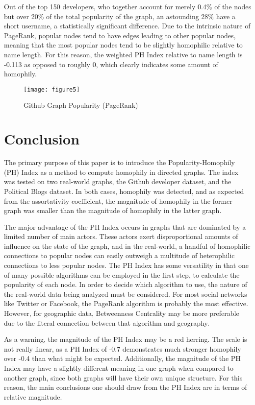 \documentclass{article}
\begin{document}
Out of the top 150 developers, who together account for merely 0.4\% of
the nodes but over 20\% of the total popularity of the graph, an
astounding 28\% have a short username, a statistically significant
difference. Due to the intrinsic nature of PageRank, popular nodes tend
to have edges leading to other popular nodes, meaning that the most
popular nodes tend to be slightly homophilic relative to name length.
For this reason, the weighted PH Index relative to name length is -0.113
as opposed to roughly 0, which clearly indicates some amount of
homophily.

\begin{figure}
  \centering
	\texttt{[image: figure5]}
	\caption{Github Graph Popularity (PageRank)}
	\label{page_rank}
\end{figure}

\section{Conclusion}

The primary purpose of this paper is to introduce the
Popularity-Homophily (PH) Index as a method to compute homophily in
directed graphs. The index was tested on two real-world graphs, the
Github developer dataset, and the Political Blogs dataset. In both
cases, homophily was detected, and as expected from the assortativity
coefficient, the magnitude of homophily in the former graph was smaller
than the magnitude of homophily in the latter graph.

The major advantage of the PH Index occurs in graphs that are dominated
by a limited number of main actors. These actors exert disproportional
amounts of influence on the state of the graph, and in the real-world, a
handful of homophilic connections to popular nodes can easily outweigh a
multitude of heterophilic connections to less popular nodes. The PH
Index has some versatility in that one of many possible algorithms can
be employed in the first step, to calculate the popularity of each node.
In order to decide which algorithm to use, the nature of the real-world
data being analyzed must be considered. For most social networks like
Twitter or Facebook, the PageRank algorithm is probably the most
effective. However, for geographic data, Betweenness Centrality may be
more preferable due to the literal connection between that algorithm and
geography.

As a warning, the magnitude of the PH Index may be a red herring. The
scale is not really linear, as a PH Index of -0.7 demonstrates much
stronger homophily over -0.4 than what might be expected. Additionally,
the magnitude of the PH Index may have a slightly different meaning in
one graph when compared to another graph, since both graphs will have
their own unique structure. For this reason, the main conclusions one
should draw from the PH Index are in terms of relative magnitude.
\end{document}
